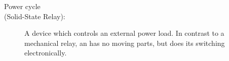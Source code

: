 \documentclass[letterpaper,twoside,onecolumn,openright,final]{memoir}
\begin{document}
\begin{description}
	\item[Power cycle]
	\item[ (Solid-State Relay):] A device which controls an external power load.  In
		contrast to a mechanical relay, an  has no moving parts, but does its switching
		electronically.
\end{description}



\indexintoc
\printindex
\clearpage


\end{document}
